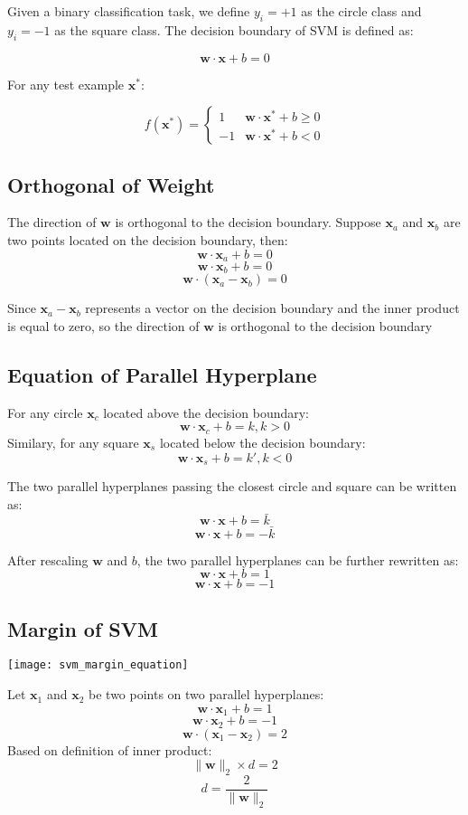 \begin{multicols*}{2}
\noindent Given a binary classification task, we define $y_i=+1$ as the circle class and $y_i=-1$ as the square class. The decision boundary of SVM is defined as:

$$\mathbf{w} \cdot \mathbf{x} + b = 0$$

\noindent For any test example $\mathbf{x^*}$:

$$
f(\mathbf{x^*}) = 
\begin{cases}
1 & \mathbf{w} \cdot \mathbf{x^*} + b \ge 0 \\
-1 & \mathbf{w} \cdot \mathbf{x^*} + b < 0
\end{cases}
$$

\subsection{Orthogonal of Weight}

\noindent The direction of $\mathbf{w}$ is orthogonal to the decision boundary. Suppose $\mathbf{x}_a$ and $\mathbf{x}_b$ are two points located on the decision boundary, then:
$$\mathbf{w} \cdot \mathbf{x}_a + b = 0$$
$$\mathbf{w} \cdot \mathbf{x}_b + b = 0$$
$$\mathbf{w} \cdot (\mathbf{x}_a -\mathbf{x}_b) = 0$$

\noindent Since $\mathbf{x}_a -\mathbf{x}_b$ represents a vector on the decision boundary and the inner product is equal to zero, so the direction of $\mathbf{w}$ is orthogonal to the decision boundary

\subsection{Equation of Parallel Hyperplane}

\noindent For any circle $\mathbf{x}_c$ located above the decision boundary:
$$\mathbf{w} \cdot \mathbf{x}_c + b = k, k>0$$
\noindent Similary, for any square $\mathbf{x}_s$ located below the decision boundary:
$$\mathbf{w} \cdot \mathbf{x}_s + b = k', k<0$$

\noindent The two parallel hyperplanes passing the closest circle and square can be written as:
$$\mathbf{w} \cdot \mathbf{x} + b = \bar{k}$$
$$\mathbf{w} \cdot \mathbf{x} + b = -\bar{k}$$

\noindent After rescaling $\mathbf{w}$ and $b$, the two parallel hyperplanes can be further rewritten as:
$$\mathbf{w} \cdot \mathbf{x} + b = 1$$
$$\mathbf{w} \cdot \mathbf{x} + b = -1$$

\subsection{Margin of SVM}
\begin{center}
\texttt{[image: svm\_margin\_equation]}
\end{center}
\noindent Let $\mathbf{x}_1$ and $\mathbf{x}_2$ be two points on two parallel hyperplanes:
$$\mathbf{w} \cdot \mathbf{x}_1 + b = 1$$
$$\mathbf{w} \cdot \mathbf{x}_2 + b = -1$$
$$\mathbf{w} \cdot (\mathbf{x}_1 - \mathbf{x}_2)= 2$$
\noindent Based on definition of inner product:
$$\| \mathbf{w} \|_2 \times d = 2$$
$$d = \frac{2}{\| \mathbf{w} \|_2}$$


\end{multicols*}
